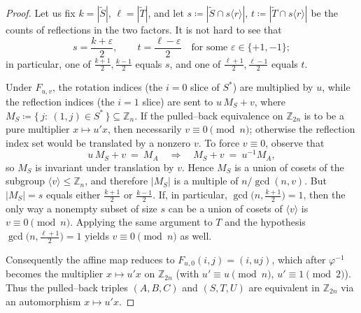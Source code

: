 \documentclass[10pt,a4paper]{amsart}
\newcommand{\Z}{\mathbb{Z}}
\begin{document}
\begin{proof}
Let us fix $k=|\widetilde S|$, $\ell=|\widetilde T|$, and let
$s\coloneqq |\widetilde S\cap s\langle r\rangle|$, $t\coloneqq |\widetilde T\cap s\langle r\rangle|$
be the counts of reflections in the two factors. 
It is not hard to see that 
\[
s=\frac{k+\varepsilon}{2},\qquad t=\frac{\ell-\varepsilon}{2}
\quad\text{for some }\varepsilon\in\{+1,-1\};
\]
in particular, one of $\frac{k+1}{2},\frac{k-1}{2}$ equals $s$, and one of
$\frac{\ell+1}{2},\frac{\ell-1}{2}$ equals $t$.

Under $F_{u,v}$, the rotation indices (the $i=0$ slice of $S^*$) are multiplied by $u$,
while the reflection indices (the $i=1$ slice) are sent to $u\,M_S+v$, where
$M_S\coloneqq \{\,j:\ (1,j)\in S^*\,\}\subseteq\Z_n$.
If the pulled–back equivalence on $\Z_{2n}$ is to be a pure multiplier $x\mapsto u'x$,
then necessarily $v\equiv 0\pmod n$; otherwise the reflection index set would be
translated by a nonzero $v$. To force $v\equiv 0$, observe that
\[
u\,M_S+v\ =\ M_A\quad\Longrightarrow\quad M_S+v\ =\ u^{-1}M_A,
\]
so $M_S$ is invariant under translation by $v$. Hence $M_S$ is a union of cosets of
the subgroup $\langle v\rangle\le\Z_n$, and therefore $|M_S|$ is a multiple of
$n/\gcd(n,v)$. But $|M_S|=s$ equals either $\tfrac{k+1}{2}$ or $\tfrac{k-1}{2}$.
If, in particular, $\gcd\!\bigl(n,\tfrac{k+1}{2}\bigr)=1$, then the only way a nonempty
subset of size $s$ can be a union of cosets of $\langle v\rangle$ is $v\equiv 0\pmod n$.
Applying the same argument to $T$ and the hypothesis
$\gcd\!\bigl(n,\tfrac{\ell+1}{2}\bigr)=1$ yields $v\equiv 0\pmod n$ as well.

Consequently the affine map reduces to $F_{u,0}(i,j)=(i,uj)$, which after $\varphi^{-1}$
becomes the multiplier $x\mapsto u'x$ on $\Z_{2n}$ (with $u'\equiv u\pmod n$, $u'\equiv 1\pmod 2$).
Thus the pulled–back triples $(A,B,C)$ and $(S,T,U)$ are equivalent in $\Z_{2n}$ via
an automorphism $x\mapsto u'x$.
\end{proof}
\end{document}
